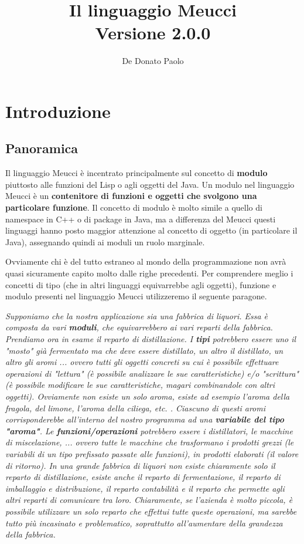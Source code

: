 \documentclass[10pt]{book}%
\author{De Donato Paolo}
\title{\textbf{\huge Il linguaggio Meucci\\
\large Versione 2.0.0}}
\date{}
\newcommand{\e}{\`{e} }
\renewcommand{\emph}[1]{\textbf{#1}}
\begin{document}
\maketitle
\tableofcontents
\chapter{Introduzione}
\section{Panoramica}
Il linguaggio Meucci \e incentrato principalmente sul concetto di \emph{modulo} piuttosto alle funzioni del Lisp o agli oggetti del Java. Un modulo nel linguaggio Meucci \e un \emph{contenitore di funzioni e oggetti che svolgono una particolare funzione}. Il concetto di modulo \e molto simile a quello di namespace in C++ o di package in Java, ma a differenza del Meucci questi linguaggi hanno posto maggior attenzione al concetto di oggetto (in particolare il Java), assegnando quindi ai moduli un ruolo marginale.

Ovviamente chi \e del tutto estraneo al mondo della programmazione non avr\`{a} quasi sicuramente capito molto dalle righe precedenti. Per comprendere meglio i concetti di tipo (che in altri linguaggi equivarrebbe agli oggetti), funzione e modulo presenti nel linguaggio Meucci utilizzeremo il seguente paragone.

\textit{Supponiamo che la nostra applicazione sia una fabbrica di liquori. Essa \e composta da vari \textbf{moduli}, che equivarrebbero ai vari reparti della fabbrica. Prendiamo ora in esame il reparto di distillazione. I \textbf{tipi} potrebbero essere uno il "mosto" gi\`{a} fermentato ma che deve essere distillato, un altro il distillato, un altro gli aromi ... ovvero tutti gli oggetti concreti su cui \e possibile effettuare operazioni di "lettura" (\e possibile analizzare le sue caratteristiche) e/o "scrittura" (\e possibile modificare le sue caratteristiche, magari combinandole con altri oggetti). Ovviamente non esiste un solo aroma, esiste ad esempio l'aroma della fragola, del limone, l'aroma della ciliega, etc. . Ciascuno di questi aromi corrisponderebbe all'interno del nostro programma ad una \textbf{variabile del tipo "aroma"}. Le \textbf{funzioni/operazioni} potrebbero essere i distillatori, le macchine di miscelazione, ... ovvero tutte le macchine che trasformano i prodotti grezzi (le variabili di un tipo prefissato passate alle funzioni), in prodotti elaborati (il valore di ritorno). In una grande fabbrica di liquori non esiste chiaramente solo il reparto di distillazione, esiste anche il reparto di fermentazione, il reparto di imballaggio e distribuzione, il reparto contabilit\`{a} e il reparto che permette agli altri reparti di comunicare tra loro. Chiaramente, se l'azienda \e molto piccola, \e possibile utilizzare un solo reparto che effettui tutte queste operazioni, ma sarebbe tutto pi\`{u} incasinato e problematico, soprattutto all'aumentare della grandezza della fabbrica.}
\end{document}
